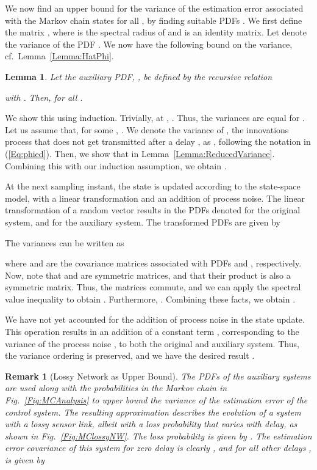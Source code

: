 \documentclass[twocolumn]{autart}
\newtheorem{lemma}[theorem]{Lemma}
\newtheorem{remark}{Remark}[section]
\newenvironment{proof}[1][Proof]{\begin{trivlist}
\item[\hskip \labelsep {\bfseries #1}]}{\end{trivlist}}
\renewcommand{\qed}{}
\begin{document}
We now find an upper bound for the variance of the estimation error associated with the Markov chain states  for all , by finding suitable PDFs . We first define the matrix , where  is the spectral radius of  and  is an identity matrix. Let  denote the variance of the PDF . We now have the following bound on the variance, cf.~Lemma~\ref{Lemma:HatPhi}. \begin{lemma} \label{Lemma:HatPhiVec}
Let the auxiliary PDF, , be defined by the recursive relation

with . Then,  for all .
\end{lemma}
\begin{proof}
We show this using induction. Trivially, at , . Thus, the variances are equal for . Let us assume that, for some , . We denote the variance of , the innovations process that does not get transmitted after a delay , as , following the notation in (\ref{Eq:phied}). Then, we show that  in Lemma~\ref{Lemma:ReducedVariance}. Combining this with our induction assumption, we obtain .

At the next sampling instant, the state is updated according to the state-space model, with a linear transformation and an addition of process noise. The linear transformation of a random vector results in the PDFs denoted  for the original system, and  for the auxiliary system. The transformed PDFs are given by

The variances can be written as

where  and  are the covariance matrices associated with PDFs  and , respectively. Now, note that  and  are symmetric matrices, and that their product  is also a symmetric matrix. Thus, the matrices commute, and we can apply the spectral value inequality to obtain . Furthermore, . Combining these facts, we obtain .

We have not yet accounted for the addition of process noise in the state update. This operation results in an addition of a constant term , corresponding to the variance of the process noise , to both the original and auxiliary system. Thus, the variance ordering is preserved, and we have the desired result . \hfill \qed
\end{proof}

\begin{remark}[Lossy Network as Upper Bound]
The PDFs of the auxiliary systems are used along with the probabilities in the Markov chain in Fig.~\ref{Fig:MCAnalysis} to upper bound the variance of the estimation error of the control system. The resulting approximation describes the evolution of a system with a lossy sensor link, albeit with a loss probability that varies with delay, as shown in Fig.~\ref{Fig:MClossyNW}. The loss probability is given by . The estimation error covariance of this system for zero delay is clearly , and for all other delays , is given by

\end{remark}
\end{document}
